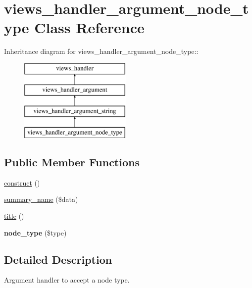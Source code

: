 \hypertarget{classviews__handler__argument__node__type}{
\section{views\_\-handler\_\-argument\_\-node\_\-type Class Reference}
\label{classviews__handler__argument__node__type}
}
Inheritance diagram for views\_\-handler\_\-argument\_\-node\_\-type::\begin{figure}[H]
\begin{center}
\leavevmode
\includegraphics[height=4cm]{classviews__handler__argument__node__type}
\end{center}
\end{figure}
\subsection*{Public Member Functions}
\begin{DoxyCompactItemize}
\item 
\hyperlink{classviews__handler__argument__node__type_a46ce861fa61b59bb22f001501c3b2650}{construct} ()
\item 
\hyperlink{classviews__handler__argument__node__type_ae4200f641b598c219f733f10386f7d90}{summary\_\-name} (\$data)
\item 
\hyperlink{classviews__handler__argument__node__type_ac17f7b9733895da68b132e6b97dcc917}{title} ()
\item 
\hypertarget{classviews__handler__argument__node__type_ab556e038442ee50ebf55e43a793796ec}{
{\bfseries node\_\-type} (\$type)}
\label{classviews__handler__argument__node__type_ab556e038442ee50ebf55e43a793796ec}

\end{DoxyCompactItemize}


\subsection{Detailed Description}
Argument handler to accept a node type. 

